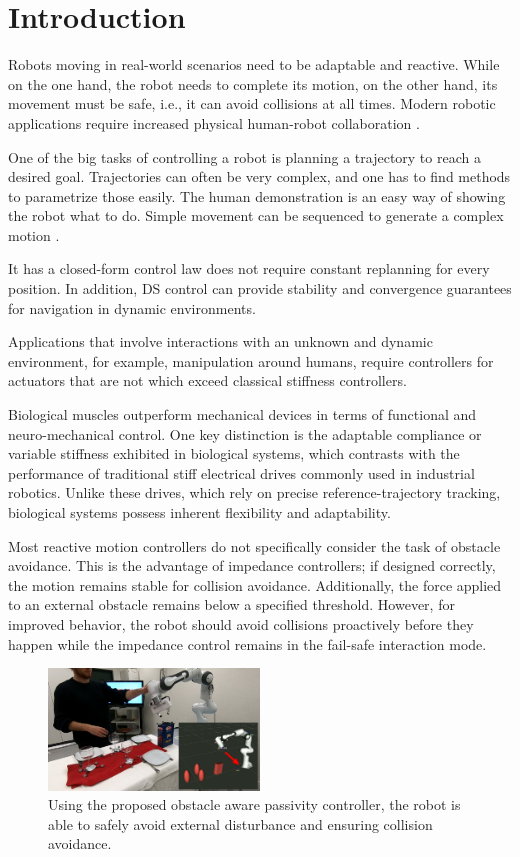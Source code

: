 \section{Introduction}
Robots moving in real-world scenarios need to be adaptable and reactive.
While on the one hand, the robot needs to complete its motion, on the other hand, its movement must be safe, i.e., it can avoid collisions at all times.
Modern robotic applications require increased physical human-robot collaboration \cite{ajoudani2018progress}.

One of the big tasks of controlling a robot is planning a trajectory to reach a desired goal. Trajectories can often be very complex, and one has to find methods to parametrize those easily. The human demonstration is an easy way of showing the robot what to do. Simple movement can be sequenced to generate a complex motion \cite{gribovskaya2011motion}.

It has a closed-form control law does not require constant replanning for every position. In addition, DS control can provide stability and convergence guarantees for navigation in dynamic environments.

Applications that involve interactions with an unknown and dynamic environment, for example, manipulation around humans, require controllers for actuators that are not which exceed classical stiffness controllers.

Biological muscles outperform mechanical devices in terms of functional and neuro-mechanical control. One key distinction is the adaptable compliance or variable stiffness exhibited in biological systems, which contrasts with the performance of traditional stiff electrical drives commonly used in industrial robotics. Unlike these drives, which rely on precise reference-trajectory tracking, biological systems possess inherent flexibility and adaptability.

Most reactive motion controllers do not specifically consider the task of obstacle avoidance. This is the advantage of impedance controllers; if designed correctly, the motion remains stable for collision avoidance. Additionally, the force applied to an external obstacle remains below a specified threshold. 
However, for improved behavior, the robot should avoid collisions proactively before they happen while the impedance control remains in the fail-safe interaction mode.

\begin{figure}
\centerline{\includegraphics[width=0.5\textwidth]{figures/robot_arm_table_avoidance}}
\caption{Using the proposed obstacle aware passivity controller, the robot is able to safely avoid external disturbance and ensuring collision avoidance.}
\label{fig:table_avoidance_with_obstacle}
\end{figure}


